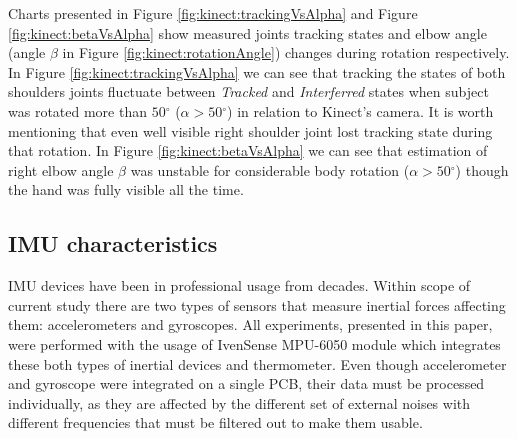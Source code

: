 \documentclass[sensors,article,submit,moreauthors,pdftex,10pt,a4paper]{mdpi}
\newcommand{\degree}{\ensuremath{{}^{\circ}}\xspace}
\begin{document}
Charts presented in Figure \ref{fig:kinect:trackingVsAlpha} and Figure \ref{fig:kinect:betaVsAlpha} show measured joints tracking states and elbow angle (angle $\beta$ in Figure \ref{fig:kinect:rotationAngle}) changes during rotation respectively. In Figure \ref{fig:kinect:trackingVsAlpha}  we can see that tracking the states of both shoulders joints fluctuate between \emph{Tracked} and \emph{Interferred} states when subject was rotated more than $50\degree$ ($\alpha > 50\degree$) in relation to Kinect’s camera. It is worth mentioning that even well visible right shoulder joint lost tracking state during that rotation. In Figure \ref{fig:kinect:betaVsAlpha} we can see that estimation of right elbow angle $\beta$ was unstable for considerable body rotation ($\alpha > 50\degree$) though the hand was fully visible all the time.

\subsection{IMU characteristics}
IMU devices have been in professional usage from decades. Within scope of current study there are two types of sensors that measure inertial forces affecting them: accelerometers and gyroscopes. All experiments, presented in this paper, were performed with the usage of IvenSense MPU-6050 module which integrates these both types of inertial devices and thermometer. Even though accelerometer and gyroscope were integrated on a single PCB, their data must be processed individually, as they are affected by the different set of external noises with different frequencies that must be filtered out to make them usable.
\end{document}
